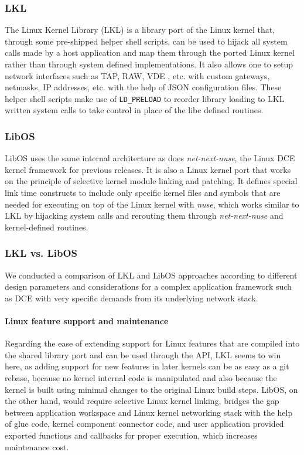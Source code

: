 \documentclass{sig-alternate}
\begin{document}
\subsubsection{LKL}
The Linux Kernel Library (LKL) is a library port of the Linux kernel that, through some pre-shipped helper shell scripts, can be used to hijack
all system calls made by a host application and map them through the ported Linux kernel rather than through system defined implementations. It also allows one 
to setup network interfaces such as TAP, RAW, VDE , etc. with custom gateways, netmasks, IP addresses, etc. with the help of JSON configuration files. These helper
shell scripts make use of \texttt{LD\_PRELOAD} to reorder library loading to LKL written system calls to take control in place of the libc defined routines.
 
\subsubsection{LibOS}
LibOS uses the same internal architecture as does \textit{net-next-nuse},
the Linux DCE kernel framework for previous releases.
It is also a Linux kernel port that works on the principle of selective 
kernel module linking and patching. It defines special link time constructs
to include only specific kernel files and 
symbols that are needed for executing on top of the Linux kernel with \textit{nuse}, which works similar to LKL by hijacking system calls 
and rerouting them through \emph{net-next-nuse} and kernel-defined routines.

\subsubsection{LKL vs. LibOS}
We conducted a comparison of LKL and LibOS approaches according to different design parameters and considerations for a complex application framework such as
DCE with very specific demands from its underlying network stack.

\paragraph{Linux feature support and maintenance}
Regarding the ease of extending support for Linux features that are compiled into the shared library port and 
can be used through the API, LKL seems to win here, as adding support for new features in later kernels can be as easy as a git rebase, because no kernel internal code  
is manipulated and also because the kernel is built using minimal changes to the original Linux build steps. LibOS, on the other hand, would require selective Linux 
kernel linking, bridges the gap between application workspace and Linux kernel networking stack with the help of glue code, kernel component connector code, and user 
application provided exported functions and callbacks for proper execution, which increases maintenance cost.
\end{document}
